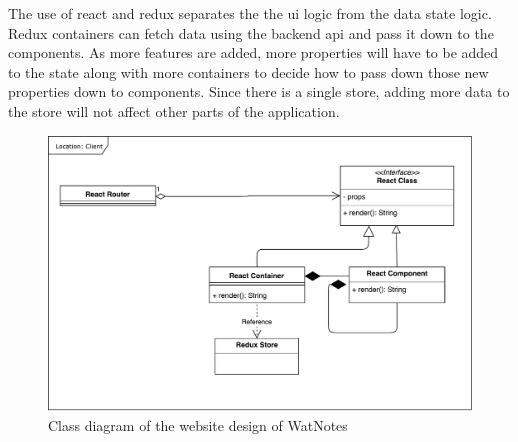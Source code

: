 \documentclass[12pt]{article}
\begin{document}
  The use of react and redux separates the the ui logic from the data state logic. Redux containers can fetch data using the backend api and pass it down to the components. As more features are added, more properties will have to be added to the state along with more containers to decide how to pass down those new properties down to components. Since there is a single store, adding more data to the store will not affect other parts of the application.

  \begin{figure}[H]
    \centering
    \includegraphics[width=\textwidth]{assets/frontend_design.pdf}
    \caption{Class diagram of the website design of WatNotes}
  \end{figure}
\end{document}
